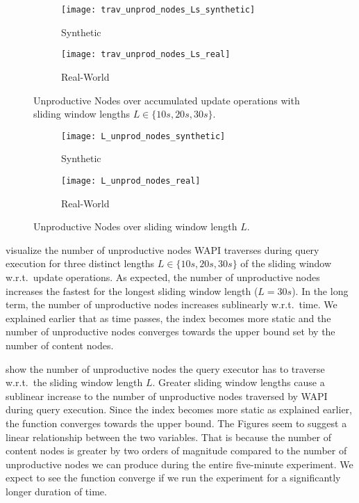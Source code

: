 \documentclass[abstracton,12pt]{scrartcl}
\theoremstyle{definition}
\begin{document}
\begin{figure}[h]
  \centering
  \begin{subfigure}{0.49\linewidth}
    \centering
    \caption{Synthetic}
    \texttt{[image: trav\_unprod\_nodes\_Ls\_synthetic]}
    \label{fig:trav_unprod_nodes_Ls_synthetic}
  \end{subfigure}
  \begin{subfigure}{0.49\linewidth}
    \centering
    \caption{Real-World}
    \texttt{[image: trav\_unprod\_nodes\_Ls\_real]}
    \label{fig:trav_unprod_nodes_Ls_real}
  \end{subfigure}
  \vspace{-0.65cm}
  \caption[Unproductive Nodes over update operations with lengths 
    $L \in \{10s,20s,30s\}$]{Unproductive Nodes over accumulated update operations with
    sliding window lengths $L \in \{10s,20s,30s\}$.}
\end{figure}

\begin{figure}[h]
  \centering
  \begin{subfigure}{0.49\linewidth}
    \centering
    \caption{Synthetic}
    \texttt{[image: L\_unprod\_nodes\_synthetic]}
    \label{fig:L_trav_unprod_nodes_synthetic}
  \end{subfigure}
  \begin{subfigure}{0.49\linewidth}
    \centering
    \caption{Real-World}
    \texttt{[image: L\_unprod\_nodes\_real]}
    \label{fig:L_trav_unprod_nodes_real}
  \end{subfigure}
  \vspace{-0.65cm}
  \caption[Unproductive Nodes over sliding window length $L$]{
  Unproductive Nodes over sliding window length $L$.}
\end{figure}

 visualize
the number of unproductive nodes WAPI traverses during query execution for
three distinct lengths $L \in \{10s,20s,30s\}$ of the sliding window w.r.t.\ update
operations. As expected, the number of unproductive nodes
increases the fastest for the longest sliding window length ($L = 30s$).
In the long term,
the number of unproductive nodes increases sublinearly w.r.t.\ time.
We explained earlier that as time passes, the index becomes more static
and the number of unproductive nodes converges towards the upper bound
set by the number of content nodes.

 show the
number of unproductive nodes the query executor has to traverse w.r.t.\ the
sliding window length $L$. Greater sliding window lengths 
cause a sublinear increase to the number of unproductive nodes traversed 
by WAPI during query execution. Since the index becomes more static 
as explained earlier, the function converges towards the upper bound. 
The Figures seem to suggest a linear relationship
between the two variables. That is because the number of content nodes is greater
by two orders of magnitude compared to the number of unproductive nodes we can
produce during the entire five-minute experiment. We expect to see the function 
converge if we run the experiment for a significantly longer duration of time.
\end{document}
